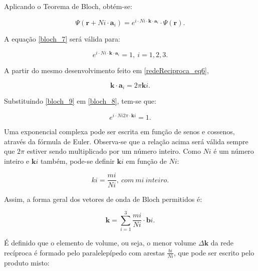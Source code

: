 		\par Aplicando o Teorema de Bloch, obtém-se:

		\begin{equation}
			\label{bloch_7}
			\Psi(\mathbf{r} + Ni \cdot \mathbf{a}_{i}) = e^{i\cdot N i \cdot \mathbf{k} \cdot \mathbf{a}_{i}} \cdot \Psi(\mathbf{r}).
		\end{equation}

		\par A equação \eqref{bloch_7} será válida para:

		\begin{equation}
			\label{bloch_8}
			e^{i\cdot N i \cdot \mathbf{k} \cdot \mathbf{a}_{i}} = 1,\ i=1,2,3.
		\end{equation}

		\par A partir do mesmo desenvolvimento feito em \eqref{redeReciproca_eq6},

		\begin{equation}
			\label{bloch_9}
			\mathbf{k} \cdot \mathbf{a}_{i} = 2 \pi \mathbf{k} i.
		\end{equation}

		\par Substituindo \eqref{bloch_9} em \eqref{bloch_8}, tem-se que:

		\begin{equation}
			\label{bloch_10}
			e^{i\cdot N i 2 \pi \cdot \mathbf{k} i} = 1.
		\end{equation}

		\par Uma exponencial complexa pode ser escrita em função de senos e cossenos, através da fórmula de Euler. Observa-se que a relação acima será válida sempre que $2\pi$ estiver sendo multiplicado por um número inteiro. Como $Ni$ é um número inteiro e $\mathbf{k}i$ também, pode-se definir $\mathbf{k}i$ em função de $Ni$:

		\begin{equation}
			\label{bloch_a}
			ki = \frac{mi}{Ni},\ com\ mi\ inteiro.
		\end{equation}

		\par Assim, a forma geral dos vetores de onda de Bloch permitidos é:


		\begin{equation}
			\label{bloch_11}
			\mathbf{k} = \sum_{i=1}^3 \frac{mi}{Ni} \cdot \mathbf{b}i.
		\end{equation}

		\par É definido que o elemento de volume, ou seja, o menor volume $\Delta\mathbf{k}$ da rede recíproca é formado pelo paralelepípedo com arestas $\frac{bi}{Ni}$, que pode ser escrito pelo produto misto:

